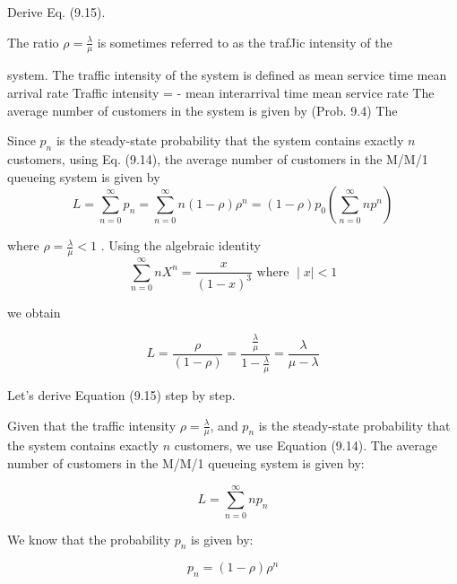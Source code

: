 

\usepackage{vmargin}
\setmargins{2.0cm}{2.5cm}{16 cm}{22cm}{0.5cm}{0cm}{1cm}{1cm}
\renewcommand{\baselinestretch}{1.3}

\setcounter{MaxMatrixCols}{10}


\large 






Derive Eq. (9.15). 

 The ratio ${\rho = \frac{\lambda}{\mu}}$ is sometimes referred to as the trafJic intensity of the 

system. The traffic intensity of the system is defined as 
mean service time mean arrival rate Traffic intensity = - mean interarrival time mean service rate 
The average number of customers in the system is given by (Prob. 9.4) 
The

\newpage 

Since $p_n$ is the steady-state probability that the system contains exactly $n$ customers, using Eq. (9.14), 
the average number of customers in the M/M/1 queueing system is given by \[ L = \sum^{\infty}_{n=0}p_{n} =\sum^{\infty}_{n=0} n(1-\rho) \rho^{n} = (1-\rho) p_{0}\left(\sum^{\infty}_{n=0}np^{n}\right)  \]

where ${\rho = \frac{\lambda}{\mu} < 1}$ . Using the algebraic identity 
\[\sum^{\infty}_{n=0}nX^{n} = \frac{x}{(1-x)^3} \mbox{ where } \mid x \mid < 1 \]

we obtain 

\[L =  \frac{\rho}{(1-\rho)} = \frac{\frac{\lambda}{\mu}}{1- \frac{\lambda}{\mu} } = \frac{\lambda}{\mu-\lambda}\]


Let's derive Equation (9.15) step by step. 

Given that the traffic intensity \(\rho = \frac{\lambda}{\mu}\), and \(p_n\) is the steady-state probability that the system contains exactly \(n\) customers, we use Equation (9.14). The average number of customers in the M/M/1 queueing system is given by:

\[ L = \sum^{\infty}_{n=0} n p_{n} \]

We know that the probability \(p_n\) is given by:

\[ p_{n} = (1 - \rho) \rho^{n} \]

